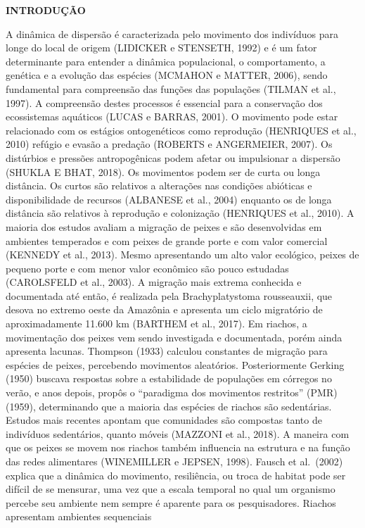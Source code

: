 \documentclass[
]{article}
\begin{document}
\textbf{INTRODUÇÃO}

A dinâmica de dispersão é caracterizada pelo movimento dos indivíduos
para longe do local de origem (LIDICKER e STENSETH, 1992) e é um fator
determinante para entender a dinâmica populacional, o comportamento, a
genética e a evolução das espécies (MCMAHON e MATTER, 2006), sendo
fundamental para compreensão das funções das populações (TILMAN et al.,
1997). A compreensão destes processos é essencial para a conservação dos
ecossistemas aquáticos (LUCAS e BARRAS, 2001). O movimento pode estar
relacionado com os estágios ontogenéticos como reprodução (HENRIQUES et
al., 2010) refúgio e evasão a predação (ROBERTS e ANGERMEIER, 2007). Os
distúrbios e pressões antropogênicas podem afetar ou impulsionar a
dispersão (SHUKLA E BHAT, 2018). Os movimentos podem ser de curta ou
longa distância. Os curtos são relativos a alterações nas condições
abióticas e disponibilidade de recursos (ALBANESE et al., 2004) enquanto
os de longa distância são relativos à reprodução e colonização
(HENRIQUES et al., 2010). A maioria dos estudos avaliam a migração de
peixes e são desenvolvidas em ambientes temperados e com peixes de
grande porte e com valor comercial (KENNEDY et al., 2013). Mesmo
apresentando um alto valor ecológico, peixes de pequeno porte e com
menor valor econômico são pouco estudadas (CAROLSFELD et al., 2003). A
migração mais extrema conhecida e documentada até então, é realizada
pela Brachyplatystoma rousseauxii, que desova no extremo oeste da
Amazônia e apresenta um ciclo migratório de aproximadamente 11.600 km
(BARTHEM et al., 2017). Em riachos, a movimentação dos peixes vem sendo
investigada e documentada, porém ainda apresenta lacunas. Thompson
(1933) calculou constantes de migração para espécies de peixes,
percebendo movimentos aleatórios. Posteriormente Gerking (1950) buscava
respostas sobre a estabilidade de populações em córregos no verão, e
anos depois, propôs o ``paradigma dos movimentos restritos'' (PMR)
(1959), determinando que a maioria das espécies de riachos são
sedentárias. Estudos mais recentes apontam que comunidades são compostas
tanto de indivíduos sedentários, quanto móveis (MAZZONI et al., 2018). A
maneira com que os peixes se movem nos riachos também influencia na
estrutura e na função das redes alimentares (WINEMILLER e JEPSEN, 1998).
Fausch et al.~(2002) explica que a dinâmica do movimento, resiliência,
ou troca de habitat pode ser difícil de se mensurar, uma vez que a
escala temporal no qual um organismo percebe seu ambiente nem sempre é
aparente para os pesquisadores. Riachos apresentam ambientes sequenciais
\end{document}
